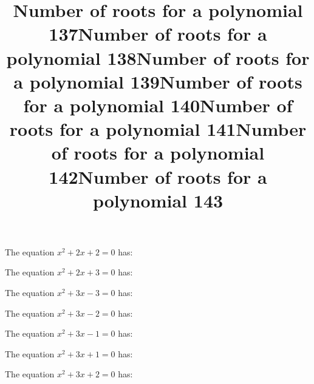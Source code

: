 \documentclass{article}
\begin{document}
\begin{category}
\begin{question}[multichoice]
\end{question}
\begin{question}[multichoice]
\title{Number of roots for a polynomial 137}
The equation $x^{2} + 2 x + 2=0$ has:


\end{question}
\begin{question}[multichoice]
\title{Number of roots for a polynomial 138}
The equation $x^{2} + 2 x + 3=0$ has:


\end{question}
\begin{question}[multichoice]
\title{Number of roots for a polynomial 139}
The equation $x^{2} + 3 x - 3=0$ has:


\end{question}
\begin{question}[multichoice]
\title{Number of roots for a polynomial 140}
The equation $x^{2} + 3 x - 2=0$ has:


\end{question}
\begin{question}[multichoice]
\title{Number of roots for a polynomial 141}
The equation $x^{2} + 3 x - 1=0$ has:


\end{question}
\begin{question}[multichoice]
\title{Number of roots for a polynomial 142}
The equation $x^{2} + 3 x + 1=0$ has:


\end{question}
\begin{question}[multichoice]
\title{Number of roots for a polynomial 143}
The equation $x^{2} + 3 x + 2=0$ has:


\end{question}
\end{category}
\end{document}
